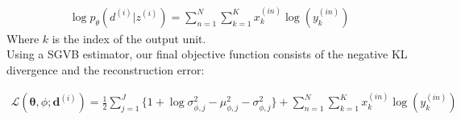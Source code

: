 \documentclass{report}
\begin{document}
\begin{align}
\log p_{\theta}(d^{(i)}|z^{(i)}) = 
\sum_{n=1}^N
\sum_{k=1}^K x_k^{(in)} \log (y_k^{(in)})
\end{align}
Where $k$ is the index of the output unit.\\


Using a SGVB estimator, our final objective function consists of the negative KL divergence and the reconstruction error:

\begin{align}
\mathcal{L}(\mathbf{\theta}, \phi; \mathbf{d}^{(i)}) = \frac{1}{2}\sum\limits_{j=1}^{J}\{1+\log \sigma_{\phi ,j}^2 - \mu_{\phi,j}^2 - \sigma_{\phi ,j}^2\} 
+ \sum_{n=1}^N
\sum_{k=1}^K x_k^{(in)} \log (y_k^{(in)})
\end{align}


\end{document}
